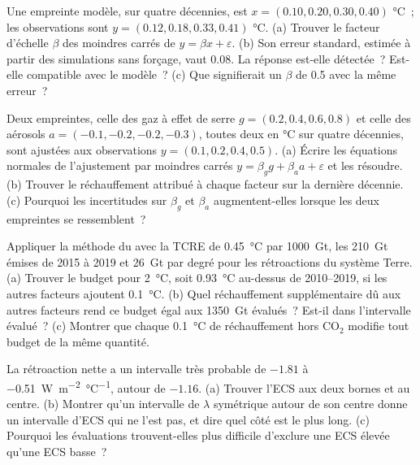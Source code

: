 \begin{exercise}[$\star\star$]\label{exo:b2:anthropogenic-climate-change:9}
Une empreinte modèle, sur quatre décennies, est $x = (0.10, 0.20, 0.30, 0.40)$ \unit{\celsius}~;
les observations sont $y = (0.12, 0.18, 0.33, 0.41)$ \unit{\celsius}. (a) Trouver le facteur
d'échelle $\beta$ des moindres carrés de $y = \beta x + \varepsilon$. (b) Son erreur standard,
estimée à partir des simulations sans forçage, vaut \num{0.08}. La réponse est-elle détectée~?
Est-elle compatible avec le modèle~? (c) Que signifierait un $\beta$ de 0.5 avec la même erreur~?
\end{exercise}

\begin{exercise}[$\star\star\star$]\label{exo:b2:anthropogenic-climate-change:10}
Deux empreintes, celle des gaz à effet de serre $g = (0.2, 0.4, 0.6, 0.8)$ et celle des aérosols $a = (-0.1, -0.2,
-0.2, -0.3)$, toutes deux en \unit{\celsius} sur quatre décennies, sont ajustées aux observations $y = (0.1,
0.2, 0.4, 0.5)$. (a) Écrire les équations normales de l'ajustement par moindres carrés $y = \beta_g g + \beta_a a
+ \varepsilon$ et les résoudre. (b) Trouver le réchauffement attribué à chaque facteur sur la dernière décennie. (c)
Pourquoi les incertitudes sur $\beta_g$ et $\beta_a$ augmentent-elles lorsque les deux empreintes se ressemblent~?
\end{exercise}

\begin{exercise}[$\star\star\star$]\label{exo:b2:anthropogenic-climate-change:11}
Appliquer la méthode du  avec la TCRE de \qty{0.45}{\celsius} par \qty{1000}{Gt},
les \qty{210}{Gt} émises de 2015 à 2019 et \qty{26}{Gt} par degré pour les rétroactions du système
Terre. (a) Trouver le budget pour \qty{2}{\celsius}, soit \qty{0.93}{\celsius} au-dessus de 2010--2019,
si les autres facteurs ajoutent \qty{0.1}{\celsius}. (b) Quel réchauffement supplémentaire dû aux autres
facteurs rend ce budget égal aux \qty{1350}{Gt} évalués~? Est-il dans l'intervalle évalué~? (c) Montrer
que chaque \qty{0.1}{\celsius} de réchauffement hors CO$_2$ modifie tout budget de la même quantité.
\end{exercise}

\begin{exercise}[$\star\star\star$]\label{exo:b2:anthropogenic-climate-change:12}
La rétroaction nette a un intervalle très probable de $-1.81$ à \qty{-0.51}{W.m^{-2}.\celsius^{-1}}, autour
de $-1.16$. (a) Trouver l'ECS aux deux bornes et au centre. (b) Montrer qu'un intervalle de $\lambda$
symétrique autour de son centre donne un intervalle d'ECS qui ne l'est pas, et dire quel côté est le plus
long. (c) Pourquoi les évaluations trouvent-elles plus difficile d'exclure une ECS élevée qu'une ECS basse~?
\end{exercise}

